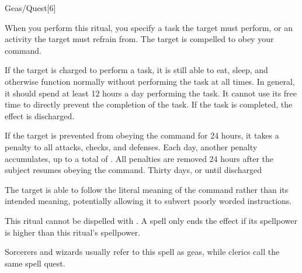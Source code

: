 \begin{spellsection}{Geas/Quest}[6]
    \begin{spellheader}
    \end{spellheader}
    \begin{spellcontent}
        \begin{spelltargetinginfo}
            \spellrng{\rngmed}
        \end{spelltargetinginfo}
        \begin{spelleffects}
            \spelleffect When you perform this ritual, you specify a task the target must perform, or an activity the target must refrain from. The target is compelled to obey your command.

            If the target is charged to perform a task, it is still able to eat, sleep, and otherwise function normally without performing the task at all times. In general, it should spend at least 12 hours a day performing the task. It cannot use its free time to directly prevent the completion of the task. If the task is completed, the effect is discharged.

            \par If the target is prevented from obeying the command for 24 hours, it takes a  penalty to all attacks, checks, and defenses. Each day, another  penalty accumulates, up to a total of . All penalties are removed 24 hours after the subject resumes obeying the command.
            \spelldur Thirty days, or until discharged \dismissable
        \end{spelleffects}
    \end{spellcontent}
    \begin{spellfooter}
        \spellnotes The target is able to follow the literal meaning of the command rather than its intended meaning, potentially allowing it to subvert poorly worded instructions.

        \par This ritual cannot be dispelled with . A  spell only ends the effect if its spellpower is higher than this ritual's spellpower.

        \par Sorcerers and wizards usually refer to this spell as geas, while clerics call the same spell quest.
    \end{spellfooter}
\end{spellsection}

